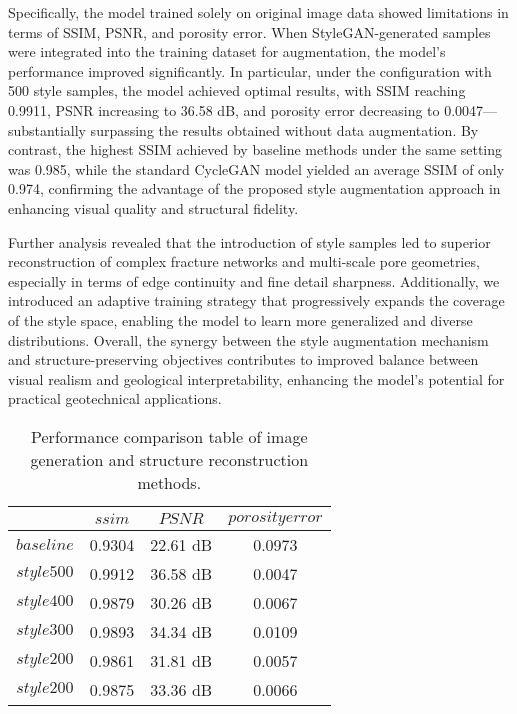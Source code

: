 \documentclass[a4paper,fleqn]{cas-sc}
\begin{document}
Specifically, the model trained solely on original image data showed limitations in terms of SSIM, PSNR, and porosity error. When StyleGAN-generated samples were integrated into the training dataset for augmentation, the model's performance improved significantly. In particular, under the configuration with 500 style samples, the model achieved optimal results, with SSIM reaching 0.9911, PSNR increasing to 36.58 dB, and porosity error decreasing to 0.0047—substantially surpassing the results obtained without data augmentation. By contrast, the highest SSIM achieved by baseline methods under the same setting was 0.985, while the standard CycleGAN model yielded an average SSIM of only 0.974, confirming the advantage of the proposed style augmentation approach in enhancing visual quality and structural fidelity.

Further analysis revealed that the introduction of style samples led to superior reconstruction of complex fracture networks and multi-scale pore geometries, especially in terms of edge continuity and fine detail sharpness. Additionally, we introduced an adaptive training strategy that progressively expands the coverage of the style space, enabling the model to learn more generalized and diverse distributions. Overall, the synergy between the style augmentation mechanism and structure-preserving objectives contributes to improved balance between visual realism and geological interpretability, enhancing the model’s potential for practical geotechnical applications.

\begin{table}
	\centering
	\caption{Performance comparison table of image generation and structure reconstruction methods.}
	\label{tab:Table1}
	\begin{tabular}{ |c||c|c|c|} 
		\hline
		& $ssim$  &  $PSNR$  &  $porosity error$\\ 
		\hline 
		\hline
		$baseline$ & 0.9304 &  22.61 dB    &   0.0973  \\
		\hline
		$style500$ & 0.9912    &   36.58 dB    &   0.0047   \\
		\hline
		$style400$ & 0.9879   &   30.26 dB    &   0.0067  \\
		\hline
		$style300$ & 0.9893    &   34.34 dB     &  0.0109   \\
		\hline
		$style200$ & 0.9861    &  31.81 dB   &   0.0057   \\
		\hline
		$style200$ & 0.9875    &    33.36 dB     & 0.0066  \\
		\hline
	\end{tabular} 
\end{table}
\end{document}
